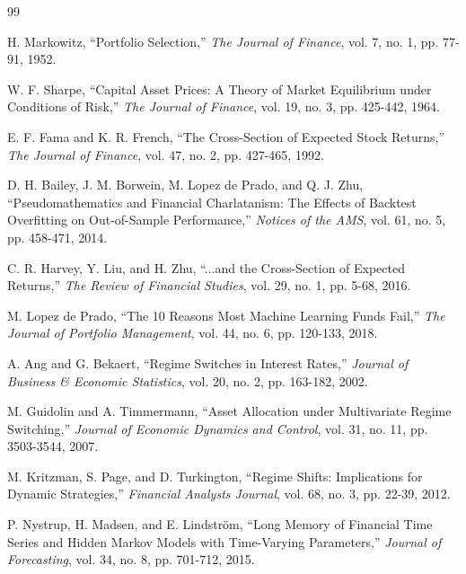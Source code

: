 \documentclass[twocolumn,ieee]{arithmaxresearch}
\begin{document}
\begin{thebibliography}{99}

H. Markowitz, ``Portfolio Selection,'' \emph{The Journal of Finance}, vol. 7, no. 1, pp. 77-91, 1952.

W. F. Sharpe, ``Capital Asset Prices: A Theory of Market Equilibrium under Conditions of Risk,'' \emph{The Journal of Finance}, vol. 19, no. 3, pp. 425-442, 1964.

E. F. Fama and K. R. French, ``The Cross-Section of Expected Stock Returns,'' \emph{The Journal of Finance}, vol. 47, no. 2, pp. 427-465, 1992.

D. H. Bailey, J. M. Borwein, M. Lopez de Prado, and Q. J. Zhu, ``Pseudomathematics and Financial Charlatanism: The Effects of Backtest Overfitting on Out-of-Sample Performance,'' \emph{Notices of the AMS}, vol. 61, no. 5, pp. 458-471, 2014.

C. R. Harvey, Y. Liu, and H. Zhu, ``...and the Cross-Section of Expected Returns,'' \emph{The Review of Financial Studies}, vol. 29, no. 1, pp. 5-68, 2016.

M. Lopez de Prado, ``The 10 Reasons Most Machine Learning Funds Fail,'' \emph{The Journal of Portfolio Management}, vol. 44, no. 6, pp. 120-133, 2018.

A. Ang and G. Bekaert, ``Regime Switches in Interest Rates,'' \emph{Journal of Business \& Economic Statistics}, vol. 20, no. 2, pp. 163-182, 2002.

M. Guidolin and A. Timmermann, ``Asset Allocation under Multivariate Regime Switching,'' \emph{Journal of Economic Dynamics and Control}, vol. 31, no. 11, pp. 3503-3544, 2007.

M. Kritzman, S. Page, and D. Turkington, ``Regime Shifts: Implications for Dynamic Strategies,'' \emph{Financial Analysts Journal}, vol. 68, no. 3, pp. 22-39, 2012.

P. Nystrup, H. Madsen, and E. Lindström, ``Long Memory of Financial Time Series and Hidden Markov Models with Time-Varying Parameters,'' \emph{Journal of Forecasting}, vol. 34, no. 8, pp. 701-712, 2015.

\end{thebibliography}
\end{document}
